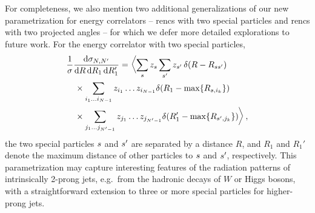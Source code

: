 

For completeness, we also mention two additional generalizations of our new parametrization for energy correlators -- \glspl{renc} with two special particles and \glspl{renc} with two projected angles -- for which we defer more detailed explorations to future work.
%
For the energy correlator with two special particles,
\begin{align}
    \label{eq:two_special}
    &\frac{1}{\sigma} \frac{\dd \sigma_{N,N'}}
    {\dd R\, \dd R_1\, \dd R_1'}
    =
    \biggl\langle
    \sum_{\izero}
    z_{\izero}  \sum_{\izero'}
    z_{\izero'}\,
    \delta(R - R_{\izero\izero'})
    \\
    & \quad \times
    \sum_{i_1 \dots i_{N-1}}
    z_{i_1} \dots z_{i_{N-1}}
    \delta (R_1 - \max\{R_{\izero,i_k}\})
    \notag
    \\
    &
    \quad  \times
    \sum_{j_1 \dots j_{N'-1}}
    z_{j_1} \dots z_{j_{N'-1}}
    \delta (R_1' - \max\{R_{\izero',j_k}\})
    \biggr
    \rangle
    \notag\,,
 \end{align}
the two special particles $s$ and $s'$ are separated by a distance $R$, and $R_1$ and $R_1'$ denote the maximum distance of other particles to $s$ and $s'$, respectively.
%
This parametrization may capture interesting features of the radiation patterns of intrinsically 2-prong jets, e.g.~from the hadronic decays of $W$ or Higgs bosons, with a straightforward extension to three or more special particles for higher-prong jets.


